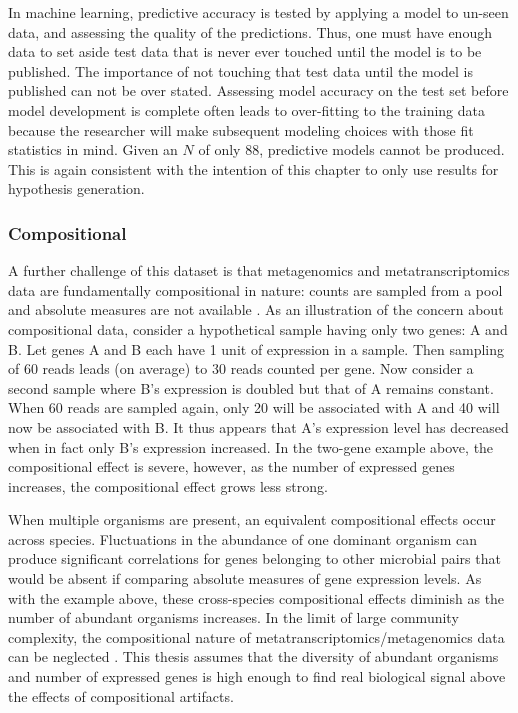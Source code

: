 In machine learning, predictive accuracy is tested by applying a model to un-seen data, and assessing the quality of the predictions.
Thus, one must have enough data to set aside test data that is never ever touched until the model is to be published.
The importance of not touching that test data until the model is published can not be over stated.
Assessing model accuracy on the test set before model development is complete often leads to over-fitting to the training data because the researcher will make subsequent modeling choices with those fit statistics in mind.
Given an $N$ of only 88, predictive models cannot be produced.
This is again consistent with the intention of this chapter to only use results for hypothesis generation.

\subsubsection{Compositional}
A further challenge of this dataset is that metagenomics and metatranscriptomics data are fundamentally compositional in nature: counts are sampled from a pool and absolute measures are not available \cite{tsilimigras2016, aitchison1982}.
As an illustration of the concern about compositional data, consider a hypothetical sample having only two genes: A and B.
Let genes A and B each have 1 unit of expression in a sample.
Then sampling of 60 reads leads (on average) to 30 reads counted per gene.
Now consider a second sample where B's expression is doubled but that of A remains constant.  When 60 reads are sampled again, only 20 will be associated with A and 40 will now be associated with B.
It thus appears that A's expression level has decreased when in fact only B's expression increased.
In the two-gene example above, the compositional effect is severe, however, as the number of expressed genes increases, the compositional effect grows less strong.

When multiple organisms are present, an equivalent compositional effects occur across species.
Fluctuations in the abundance of one dominant organism can produce significant correlations for genes belonging to other microbial pairs that would be absent if comparing absolute measures of gene expression levels.
As with the example above, these cross-species compositional effects diminish as the number of abundant organisms increases.
In the limit of large community complexity, the compositional nature of metatranscriptomics/metagenomics data can be neglected \cite{tsilimigras2016}.
This thesis assumes that the diversity of abundant organisms and number of expressed genes is high enough to find real biological signal above the effects of compositional artifacts.

